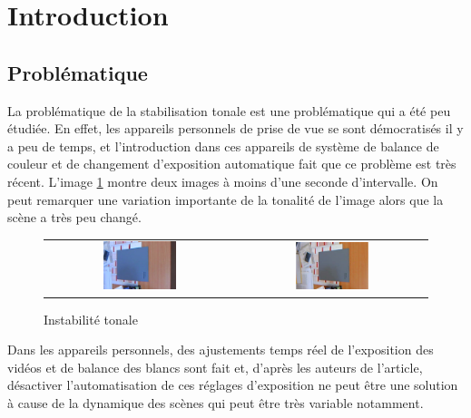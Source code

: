 \section{Introduction}
\subsection{Problématique}
La problématique de la stabilisation tonale est une problématique qui a été peu étudiée. En effet, les appareils personnels de prise de vue se sont démocratisés il y a peu de temps, et l'introduction dans ces appareils de système de balance de couleur et de changement d'exposition automatique fait que ce problème est très récent. L'image \ref{fig_unstable} montre deux images à moins d'une seconde d'intervalle. On peut remarquer une variation importante de la tonalité de l'image alors que la scène a très peu changé.\\

\begin{figure}[H]
\centering
\begin{tabular}{cc}
\includegraphics[width=0.4\textwidth]{Chapters/Images/fig_unstable2}&
\includegraphics[width=0.4\textwidth]{Chapters/Images/fig_unstable22}
\end{tabular}
\caption{Instabilité tonale}
\label{fig_unstable}
\end{figure}

Dans les appareils personnels, des ajustements temps réel de l'exposition des vidéos et de balance des blancs sont fait et, d'après les auteurs de l'article, désactiver l'automatisation de ces réglages d'exposition ne peut être une solution à cause de la dynamique des scènes qui peut être très variable notamment. \\

